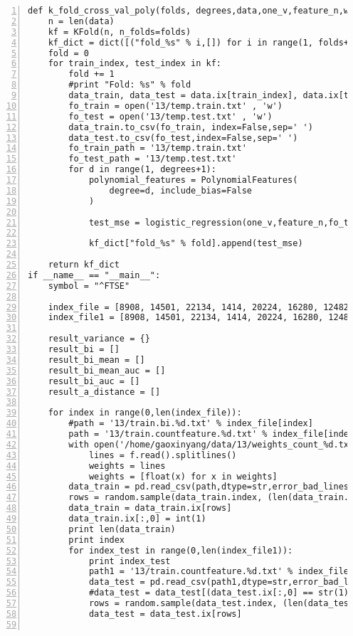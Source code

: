 \begin{lstlisting}[numbers=left, breaklines=true]
def k_fold_cross_val_poly(folds, degrees,data,one_v,feature_n,weights):
    n = len(data)
    kf = KFold(n, n_folds=folds)
    kf_dict = dict([("fold_%s" % i,[]) for i in range(1, folds+1)])
    fold = 0
    for train_index, test_index in kf:
        fold += 1
        #print "Fold: %s" % fold
        data_train, data_test = data.ix[train_index], data.ix[test_index]
        fo_train = open('13/temp.train.txt' , 'w')
        fo_test = open('13/temp.test.txt' , 'w')
        data_train.to_csv(fo_train, index=False,sep=' ')
        data_test.to_csv(fo_test,index=False,sep=' ')
        fo_train_path = '13/temp.train.txt'
        fo_test_path = '13/temp.test.txt'
        for d in range(1, degrees+1):
            polynomial_features = PolynomialFeatures(
                degree=d, include_bias=False
            )
            
            test_mse = logistic_regression(one_v,feature_n,fo_train_path,fo_test_path,weights)

            kf_dict["fold_%s" % fold].append(test_mse)

    return kf_dict
if __name__ == "__main__":
    symbol = "^FTSE"

    index_file = [8908, 14501, 22134, 1414, 20224, 16280, 12482 ,1371, 15140, 20762]
    index_file1 = [8908, 14501, 22134, 1414, 20224, 16280, 12482 ,1371, 15140, 20762]
    
    result_variance = {}
    result_bi = []
    result_bi_mean = []
    result_bi_mean_auc = [] 
    result_bi_auc = []
    result_a_distance = []

    for index in range(0,len(index_file)):
    	#path = '13/train.bi.%d.txt' % index_file[index]
        path = '13/train.countfeature.%d.txt' % index_file[index]
        with open('/home/gaoxinyang/data/13/weights_count_%d.txt' %index_file[index]) as f:
        	lines = f.read().splitlines()
        	weights = lines
        	weights = [float(x) for x in weights] 
        data_train = pd.read_csv(path,dtype=str,error_bad_lines = False,header=None,sep = ' ')
        rows = random.sample(data_train.index, (len(data_train.index) / 200))
        data_train = data_train.ix[rows]
        data_train.ix[:,0] = int(1)
        print len(data_train)
        print index
        for index_test in range(0,len(index_file1)):
            print index_test
            path1 = '13/train.countfeature.%d.txt' % index_file1[index_test]
            data_test = pd.read_csv(path1,dtype=str,error_bad_lines = False,header=None,sep = ' ')
            #data_test = data_test[(data_test.ix[:,0] == str(1))]
            rows = random.sample(data_test.index, (len(data_test.index) / 200))
            data_test = data_test.ix[rows]
            

\end{lstlisting}
